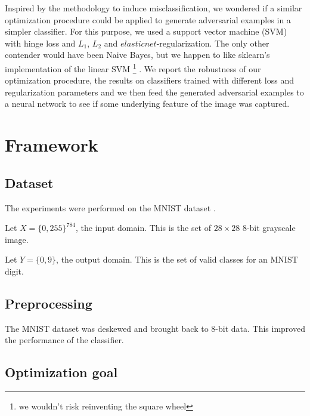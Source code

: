 \documentclass{article} %
\begin{document}
Inspired by the methodology to induce misclassification, we wondered
if a similar optimization procedure could be applied to generate adversarial
examples in a simpler classifier. For this purpose, we used a support vector machine (SVM) with hinge loss and $L_1$, $L_2$ and $elasticnet$-regularization. The only other contender would have been Naive Bayes,
but we happen to like sklearn's implementation of the linear SVM \footnote{we wouldn't
risk reinventing the square wheel} \citep{pedregosa_scikit-learn:_2011}.
We report the robustness of our optimization procedure, the results on classifiers
trained with different loss and regularization parameters and we then feed the 
generated adversarial examples to a neural network to see if some underlying
feature of the image was captured.



\section{Framework}


\subsection{Dataset}

The experiments were performed on the MNIST dataset \citep{lecun_mnist_1998}.

Let \begin{math} X=\{0, 255\}^{784} \end{math}, the input domain.
This is the set of $28\times28$ 8-bit grayscale image.

Let \begin{math} Y = \{0, 9\} \end{math}, the output domain.
This is the set of valid classes for an MNIST digit.


\subsection{Preprocessing}

The MNIST dataset was deskewed and brought back to 8-bit data. This improved the performance of the classifier.


\subsection{Optimization goal}
\end{document}
